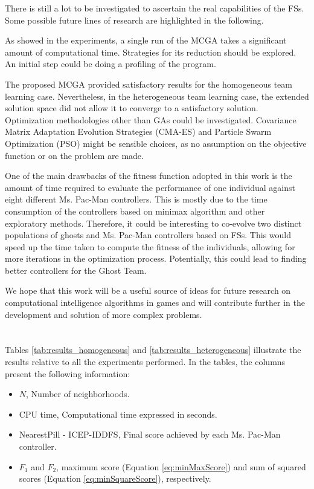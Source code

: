 \documentclass[journal]{IEEEtran}
\begin{document}
There is still a lot to be investigated to ascertain the real capabilities of the FSs. Some possible future lines of research are highlighted in the following.

As showed in the experiments, a single run of the MCGA takes a significant amount of computational time. Strategies for its reduction should be explored. An initial step could be doing a profiling of the program.

The proposed MCGA provided satisfactory results for the homogeneous team learning case. Nevertheless, in the heterogeneous team learning case, the extended solution space did not allow it to converge to a satisfactory solution. Optimization methodologies other than GAs could be investigated. Covariance Matrix Adaptation Evolution Strategies (CMA-ES) and Particle Swarm Optimization (PSO) might be sensible choices, as no assumption on the objective function or on the problem are made.

One of the main drawbacks of the fitness function adopted in this work is the amount of time required to evaluate the performance of one individual against eight different Ms. Pac-Man controllers. This is mostly due to the time consumption of the controllers based on minimax algorithm and other exploratory methods. Therefore, it could be interesting to co-evolve two distinct populations of ghosts and Ms. Pac-Man controllers based on FSs. This would speed up the time taken to compute the fitness of the individuals, allowing for more iterations in the optimization process. Potentially, this could lead to finding better controllers for the Ghost Team.

We hope that this work will be a useful source of ideas for future research on computational intelligence algorithms in games and will contribute further in the development and solution of more complex problems.

\appendices
\section{}
\label{sec:CompleteResults}
Tables \ref{tab:results_homogeneous} and \ref{tab:results_heterogeneous} illustrate the results relative to all the experiments performed. In the tables, the columns present the following information: 

\begin{itemize}
  \item $N$, Number of neighborhoods.
  \item CPU time, Computational time expressed in seconds.
  \item NearestPill - ICEP-IDDFS, Final score achieved by each Ms. Pac-Man controller.
  \item $F_1$ and $F_2$, maximum score (Equation \eqref{eq:minMaxScore}) and sum of squared scores (Equation \eqref{eq:minSquareScore}), respectively.
\end{itemize}
\end{document}
